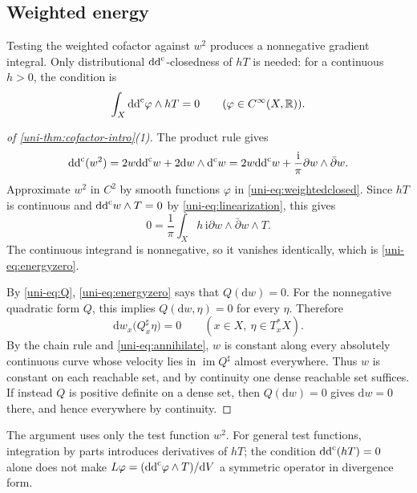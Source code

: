 \subsection{Weighted energy}

Testing the weighted cofactor against $w^2$ produces a nonnegative gradient integral. Only distributional $\mathrm{dd}^{\mathrm{c}}$-closedness of $hT$ is needed: for a continuous $h>0$, the condition is
\begin{equation}\label{uni-eq:weightedclosed}
 \int_X\mathrm{dd}^{\mathrm{c}}\varphi\wedge hT=0\qquad(\varphi\in C^\infty(X,\mathbb R)).
\end{equation}

\begin{proof}[of \cref{uni-thm:cofactor-intro}(1)]
The product rule gives
\begin{equation}\label{uni-eq:w2}
 \mathrm{dd}^{\mathrm{c}}(w^2)=2w\mathrm{dd}^{\mathrm{c}} w+2\mathrm{d}w\wedge \mathrm d^{\mathrm c} w
          =2w\mathrm{dd}^{\mathrm{c}} w+\frac{\mathrm{i}}{\pi}\partial w\wedge\bar\partial w.
\end{equation}
Approximate $w^2$ in $C^2$ by smooth functions $\varphi$ in
\eqref{uni-eq:weightedclosed}.  Since $hT$ is continuous and
$\mathrm{dd}^{\mathrm{c}} w\wedge T=0$ by \eqref{uni-eq:linearization}, this gives
\begin{equation}\label{uni-eq:energy}
 0=\frac1\pi\int_X h\,\mathrm{i}\partial w\wedge\bar\partial w\wedge T.
\end{equation}
The continuous integrand is nonnegative, so it vanishes identically, which is \eqref{uni-eq:energyzero}.

By \eqref{uni-eq:Q}, \eqref{uni-eq:energyzero} says that $Q(\mathrm{d}w)=0$. For the nonnegative quadratic form $Q$,
this implies $Q(\mathrm{d}w,\eta)=0$ for every $\eta$.  Therefore
\begin{equation}\label{uni-eq:annihilate}
 \mathrm{d}w_x\bigl(Q_x^\sharp\eta\bigr)=0\qquad(x\in X,\ \eta\in T_x^*X).
\end{equation}
By the chain rule and \eqref{uni-eq:annihilate}, $w$ is constant along every absolutely continuous curve whose velocity lies in $\operatorname{im}Q^\sharp$ almost everywhere. Thus $w$ is constant on each reachable set, and by continuity one dense reachable set suffices.  If
instead $Q$ is positive definite on a dense set, then $Q(\mathrm{d}w)=0$
gives $\mathrm{d}w=0$ there, and hence everywhere by continuity.
\end{proof}

The argument uses only the test function $w^2$. For general test functions, integration by parts introduces derivatives of $hT$; the condition $\mathrm{dd}^{\mathrm{c}}(hT)=0$ alone does not make $L\varphi=(\mathrm{dd}^{\mathrm{c}}\varphi\wedge T)/\mathrm{d}V$ a symmetric operator in divergence form.

